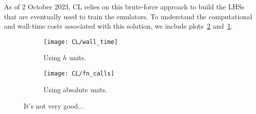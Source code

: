 \begin{comment}
The \verb|cdist| function can be re-used to compare LHSs loaded from 
different
files. However, since there is generally little reason to keep old LHSs
(except, perhaps, to reconstruct specific emulators), it reduces clutter to
simply continue overwriting the same file. Therefore, the function
\verb|multithread_unit_LHC_builder| also includes a parameter
\verb|previous_record|, which is recommended whenever the user would like to
stop the function and then resume it later. In such a case, the parameter
should be set to the \verb|cdist| value of the exis}
\end{comment}



As of 2 October 2023, CL relies on this brute-force approach to build the
LHSs that are eventually used to train the emulators. To understand the 
computational and wall-time costs associated with this solution, we include 
plots~\ref{fig: function_calls} and~\ref{fig: wall_time}.

\begin{figure}[ht!]
    \begin{subfigure}{0.45 \textwidth}
    \centering
 		\texttt{[image: CL/wall\_time]}
 		\caption{Using $h$ units.}
 		\label{fig: wall_time}
    \end{subfigure}
    \begin{subfigure}{0.45 \textwidth}
    \centering
 		\texttt{[image: CL/fn\_calls]}
 		\caption{Using absolute units.}
 		\label{fig: function_calls}
    \end{subfigure}
        \centering
    \caption[Efficiency of Brute-Force LHS Approach]
    		{It's not very good...}
    \label{fig: random_lhs_performance}
\end{figure}

\begin{comment} %
we left the system to run for two days. In this time, the 
largest minimum separation that we generated was approximately 0.08022.  
Recall from section sec_B1 that the theoretical best possible value for this 
setup is approximately 0.24183. It would have been more meaningful if you had 
counted the total number of function calls, but it isn’t too late to set up 
such a run. So, even after assigning a relatively large amount of compute to 
this brute force solution, we fail to obtain an LHC of even a third of the 
best minimum separation.
\end{comment} 

